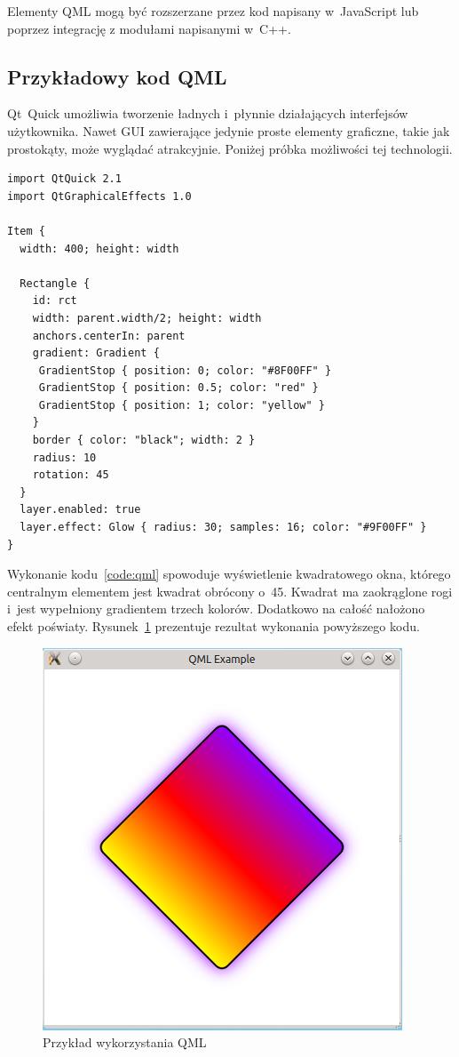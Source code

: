 Elementy QML mogą być rozszerzane przez kod napisany w~JavaScript lub poprzez integrację z modułami napisanymi w~C++.

\subsection{Przykładowy kod QML}
Qt~Quick umożliwia tworzenie ładnych i~płynnie działających interfejsów użytkownika. Nawet GUI zawierające jedynie proste elementy graficzne, takie jak prostokąty, może wyglądać atrakcyjnie. Poniżej próbka możliwości tej technologii.

\lstset{
  captionpos=t
 }
\begin{lstlisting}[caption=Przykład QML, label=code:qml]
import QtQuick 2.1
import QtGraphicalEffects 1.0

Item {
  width: 400; height: width

  Rectangle {
    id: rct
    width: parent.width/2; height: width
    anchors.centerIn: parent
    gradient: Gradient {
     GradientStop { position: 0; color: "#8F00FF" }
     GradientStop { position: 0.5; color: "red" }
     GradientStop { position: 1; color: "yellow" }
    }
    border { color: "black"; width: 2 }
    radius: 10
    rotation: 45
  }
  layer.enabled: true
  layer.effect: Glow { radius: 30; samples: 16; color: "#9F00FF" }
}
\end{lstlisting}

Wykonanie kodu~\ref{code:qml} spowoduje wyświetlenie kwadratowego okna, którego centralnym elementem jest kwadrat obrócony o~45\degree. Kwadrat ma zaokrąglone rogi i~jest wypełniony gradientem trzech kolorów. Dodatkowo na całość nałożono efekt poświaty. Rysunek~\ref{rys:qml} prezentuje rezultat wykonania powyższego kodu.

\begin{figure}[H]
\centering
\includegraphics{img/qml.png}
\caption{Przykład wykorzystania QML}\label{rys:qml}
\end{figure}

